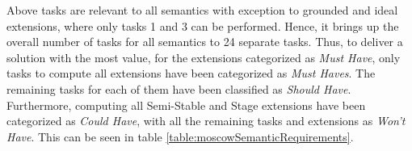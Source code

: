 Above tasks are relevant to all semantics with exception to grounded and ideal extensions, where only tasks 1 and 3 can be performed. Hence, it brings up the overall number of tasks for all semantics to 24 separate tasks. Thus, to deliver a solution with the most value, for the extensions categorized as \textit{Must Have}, only tasks to compute all extensions have been categorized as \textit{Must Haves}. The remaining tasks for each of them have been classified as \textit{Should Have}. Furthermore, computing all Semi-Stable and Stage extensions have been categorized as \textit{Could Have}, with all the remaining tasks and extensions as \textit{Won't Have}. This can be seen in table \ref{table:moscowSemanticRequirements}.


